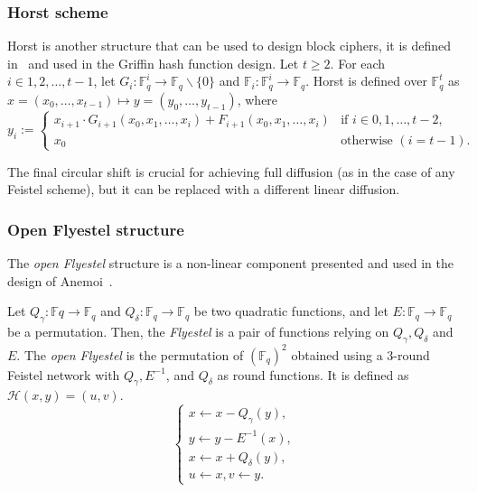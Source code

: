 \subsubsection*{Horst scheme}
\label{sec:horst}
Horst is another structure that can be used to design block ciphers, it is defined in~\cite{grassi2022horst} and used in the Griffin hash function design. Let $t\geq2$. For each $i\in{1,2,\dots,t-1}$, let $G_i:\mathbb{F}_q^i\rightarrow\mathbb{F}_q\backslash\{0\}$ and $\mathbb{F}_i:\mathbb{F}_q^i\rightarrow\mathbb{F}_q$. Horst is defined over $\mathbb{F}_q^t$ as $x=(x_0,\dots,x_{t-1})\mapsto y=(y_0,\dots,y_{t-1})$, where
\begin{equation*}
    y_i:=\begin{cases}
        x_{i+1}\cdot G_{i+1}(x_0,x_1,\dots,x_i)+F_{i+1}(x_0,x_1,\dots,x_i) & \text{if } i\in{0,1,\dots,t-2}, \\
        x_0 & \text{otherwise } (i=t-1).
    \end{cases}
\end{equation*}

The final circular shift is crucial for achieving full diffusion (as in the case of any Feistel scheme), but it can be replaced with a different linear diffusion.

\subsubsection*{Open Flyestel structure}
\label{sec:flyestel}
The \textit{open Flyestel} structure is a non-linear component presented and used in the design of Anemoi~\cite{bouvier2023new}.

Let $Q_\gamma:\mathbb{F}q\rightarrow\mathbb{F}_q$ and $Q_\delta:\mathbb{F}_q\rightarrow\mathbb{F}_q$ be two quadratic functions, and let $E:\mathbb{F}_q\rightarrow\mathbb{F}_q$ be a permutation. Then, the \textit{Flyestel} is a pair of functions relying on $Q_\gamma, Q_\delta$ and $E$. The \textit{open Flyestel} is the permutation of $(\mathbb{F}_q)^2$ obtained using a 3-round Feistel network with $Q_\gamma, E^{-1}$, and $Q_\delta$ as round functions. It is defined as $\mathcal{H}(x,y)=(u,v)$.
\begin{equation}
    \begin{cases}
        x\leftarrow x-Q_\gamma(y), \\
        y\leftarrow y-E^{-1}(x), \\
        x\leftarrow x+Q_\delta(y), \\
        u\leftarrow x,v\leftarrow y.
    \end{cases}
\end{equation}

